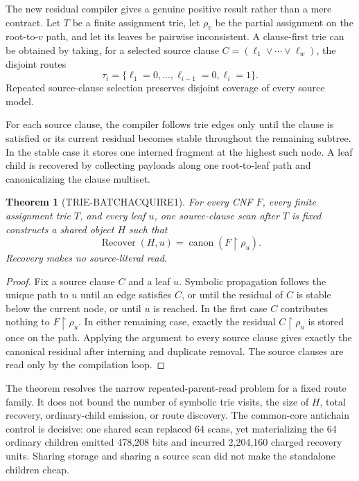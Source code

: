 \documentclass[11pt]{article}
\newtheorem{theorem}{Theorem}[section]
\begin{document}
The new residual compiler gives a genuine positive result rather than a
mere contract.  Let $T$ be a finite assignment trie, let $\rho_v$ be the
partial assignment on the root-to-$v$ path, and let its leaves be pairwise
inconsistent.  A clause-first trie can be obtained by taking, for a selected
source clause $C=(\ell_1\vee\cdots\vee\ell_w)$, the disjoint routes
\[
 \tau_i=\{\ell_1=0,\ldots,\ell_{i-1}=0,\ell_i=1\}.
\]
Repeated source-clause selection preserves disjoint coverage of every source
model.

For each source clause, the compiler follows trie edges only until the clause
is satisfied or its current residual becomes stable throughout the remaining
subtree.  In the stable case it stores one interned fragment at the highest
such node.  A leaf child is recovered by collecting payloads along one
root-to-leaf path and canonicalizing the clause multiset.

\begin{theorem}[TRIE-BATCHACQUIRE1]
For every CNF $F$, every finite assignment trie $T$, and every leaf $u$, one
source-clause scan after $T$ is fixed constructs a shared object $H$ such that
\begin{equation}
 \operatorname{Recover}(H,u)
 =\operatorname{canon}(F\upharpoonright\rho_u).
 \label{eq:batch-recover}
\end{equation}
Recovery makes no source-literal read.
\end{theorem}

\begin{proof}
Fix a source clause $C$ and a leaf $u$.  Symbolic propagation follows the
unique path to $u$ until an edge satisfies $C$, or until the residual of $C$
is stable below the current node, or until $u$ is reached.  In the first case
$C$ contributes nothing to $F\upharpoonright\rho_u$.  In either remaining
case, exactly the residual $C\upharpoonright\rho_u$ is stored once on the
path.  Applying the argument to every source clause gives exactly the
canonical residual after interning and duplicate removal.  The source clauses
are read only by the compilation loop.
\end{proof}

The theorem resolves the narrow repeated-parent-read problem for a fixed
route family.  It does not bound the number of symbolic trie visits, the size
of $H$, total recovery, ordinary-child emission, or route discovery.  The
common-core antichain control is decisive: one shared scan replaced 64 scans,
yet materializing the 64 ordinary children emitted 478,208 bits and incurred
2,204,160 charged recovery units.  Sharing storage and sharing a source scan
did not make the standalone children cheap.
\end{document}
